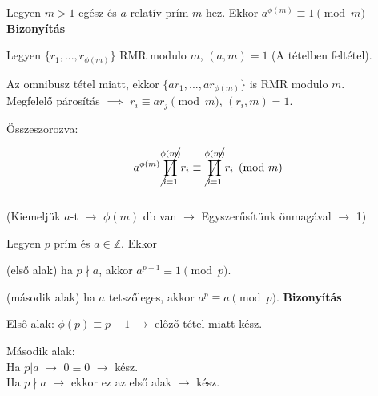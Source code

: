 \begin{frame}
  \begin{tcolorbox}[title={Tétel: Euler-Fermat tétel}]
    Legyen $m > 1$ egész és $a$ relatív prím $m$-hez. Ekkor $a^{{\phi}(m)} \equiv 1 \pmod{m}$
  \tcblower
    \textbf{Bizonyítás}
    \mmedskip
    
    Legyen $\{ r_1, ..., r_{{\phi}(m)}\}$ RMR modulo $m$, $(a, m) = 1$ (A tételben feltétel).\\
    \msmallskip

    Az omnibusz tétel miatt, ekkor $\{ ar_1, ..., ar_{{\phi}(m)}\}$ is RMR modulo $m$.\\
    Megfelelő párosítás $\implies$ $r_i \equiv ar_j \pmod{m}$,  $(r_i, m) = 1$.\\
    \msmallskip
    
    Összeszorozva:\\
    \msmallskip
    
    $$a^{{\phi}(m)} \cancel{\prod^{{\phi}(m)}_{i=1}} r_i \equiv \cancel{\prod^{{\phi}(m)}_{i=1}} r_i \pmod{m}$$\\
    (Kiemeljük $a$-t $\rightarrow$ ${\phi}(m)$ db van $\rightarrow$ Egyszerűsítünk önmagával $\rightarrow$ 1)
  \end{tcolorbox}
\end{frame}

\begin{frame}
  \begin{tcolorbox}[title={Tétel: (Kis) Fermat tétel}]
    Legyen $p$ prím és $a \in \mathbb{Z}$. Ekkor\\
    \mtinyskip
    
    (első alak) ha $p \nmid a$, akkor $a^{p-1} \equiv 1 \pmod{p}$.\\
    \mtinyskip
    
    (második alak) ha $a$ tetszőleges, akkor $a^p \equiv a \pmod{p}$.
  \tcblower
    \textbf{Bizonyítás}
    \mmedskip
    
    Első alak: ${\phi}(p) \equiv p - 1$ $\rightarrow$ előző tétel miatt kész.\\
    \mmedskip

    Második alak:\\
    Ha $p|a$ $\rightarrow$ $0 \equiv 0$ $\rightarrow$ kész.\\
    Ha $p{\nmid}a$ $\rightarrow$ ekkor ez az első alak $\rightarrow$ kész.
  \end{tcolorbox}
\end{frame}


